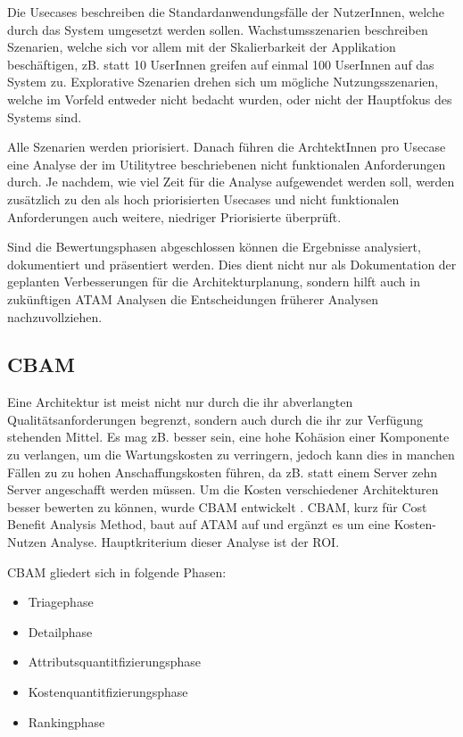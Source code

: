 Die Usecases beschreiben die Standardanwendungsfälle der NutzerInnen, welche durch das System umgesetzt werden sollen. Wachstumsszenarien beschreiben Szenarien, welche sich vor allem mit der Skalierbarkeit der Applikation beschäftigen, zB. statt 10 UserInnen greifen auf einmal 100 UserInnen auf das System zu. Explorative Szenarien drehen sich um mögliche Nutzungsszenarien, welche im Vorfeld entweder nicht bedacht wurden, oder nicht der Hauptfokus des Systems sind. \cite[S. 63]{review}

Alle Szenarien werden priorisiert. Danach führen die ArchtektInnen pro Usecase eine Analyse der im Utilitytree beschriebenen nicht funktionalen Anforderungen durch. Je nachdem, wie viel Zeit für die Analyse aufgewendet werden soll, werden zusätzlich zu den als hoch priorisierten Usecases und nicht funktionalen Anforderungen auch weitere, niedriger Priorisierte überprüft. \cite[S. 192]{basiswissen}

Sind die Bewertungsphasen abgeschlossen können die Ergebnisse analysiert, dokumentiert und präsentiert werden. Dies dient nicht nur als Dokumentation der geplanten Verbesserungen für die Architekturplanung, sondern hilft auch in zukünftigen ATAM Analysen die Entscheidungen früherer Analysen nachzuvollziehen. \cite[S. 189]{basiswissen}

\subsection{CBAM}

Eine Architektur ist meist nicht nur durch die ihr abverlangten Qualitätsanforderungen begrenzt, sondern auch durch die ihr zur Verfügung stehenden Mittel. Es mag zB. besser sein, eine hohe Kohäsion einer Komponente zu verlangen, um die Wartungskosten zu verringern, jedoch kann dies in manchen Fällen zu zu hohen Anschaffungskosten führen, da zB. statt einem Server zehn Server angeschafft werden müssen. Um die Kosten verschiedener Architekturen besser bewerten zu können, wurde CBAM entwickelt . CBAM, kurz für Cost Benefit Analysis Method, baut auf ATAM auf und ergänzt es um eine Kosten-Nutzen Analyse. Hauptkriterium dieser Analyse ist der ROI. \cite[S. 67-68]{review}

CBAM gliedert sich in folgende Phasen: \cite[S. 68]{review}

\begin{itemize}
  \item \glqq Triagephase\grqq
  \item \glqq Detailphase\grqq
  \item \glqq Attributsquantitfizierungsphase\grqq
  \item \glqq Kostenquantitfizierungsphase\grqq
  \item \glqq Rankingphase\grqq
\end{itemize}


